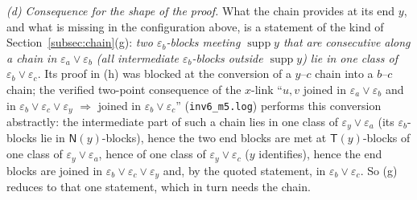 \documentclass[11pt]{amsart}
\theoremstyle{definition}
\newcommand{\supp}{\operatorname{supp}}
\newcommand{\T}{\mathsf{T}}
\newcommand{\N}{\mathsf{N}}
\begin{document}
\emph{(d) Consequence for the shape of the proof.} What the chain provides at its end $y$, and what is missing in the configuration above, is a statement of the kind of Section~\ref{subsec:chain}(g): \emph{two $\varepsilon_b$-blocks meeting $\supp y$ that are consecutive along a chain in $\varepsilon_a\vee\varepsilon_b$ (all intermediate $\varepsilon_b$-blocks outside $\supp y$) lie in one class of $\varepsilon_b\vee\varepsilon_c$}. Its proof in (h) was blocked at the conversion of a $y$--$c$ chain into a $b$--$c$ chain; the verified two-point consequence of the $x$-link ``$u,v$ joined in $\varepsilon_a\vee\varepsilon_b$ and in $\varepsilon_b\vee\varepsilon_c\vee\varepsilon_y$ $\Rightarrow$ joined in $\varepsilon_b\vee\varepsilon_c$'' (\texttt{inv6\_m5.log}) performs this conversion abstractly: the intermediate part of such a chain lies in one class of $\varepsilon_y\vee\varepsilon_a$ (its $\varepsilon_b$-blocks lie in $\N(y)$-blocks), hence the two end blocks are met at $\T(y)$-blocks of one class of $\varepsilon_y\vee\varepsilon_a$, hence of one class of $\varepsilon_y\vee\varepsilon_c$ ($y$ identifies), hence the end blocks are joined in $\varepsilon_b\vee\varepsilon_c\vee\varepsilon_y$ and, by the quoted statement, in $\varepsilon_b\vee\varepsilon_c$. So (g) reduces to that one statement, which in turn needs the chain.
\end{document}
